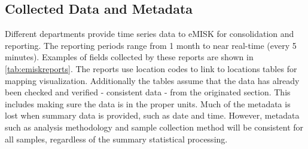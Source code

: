 \subsection{Collected Data and Metadata}
Different departments provide time series data to eMISK for consolidation and reporting. The reporting periods range from 1 month to near real-time (every 5 minutes). Examples of fields collected by these reports are shown in \ref{tab:emiskreports}. The reports use location codes to link to locations tables for mapping visualization. Additionally the tables assume that the data has already been checked and verified - consistent data - from the originated section. This includes making sure the data is in the proper units. Much of the metadata is lost when summary data is provided, such as date and time. However, metadata such as analysis methodology and sample collection method will be consistent for all samples, regardless of the summary statistical processing.

